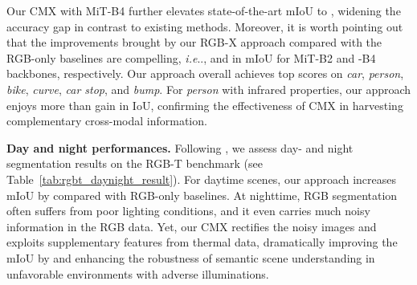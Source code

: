 \documentclass[journal]{IEEEtran}
\makeatletter
\DeclareRobustCommand\onedot{\futurelet\@let@token\@onedot}
\def\@onedot{\ifx\@let@token.\else.\null\fi\xspace}
\def\ie{\emph{i.e}\onedot} \def\Ie{\emph{I.e}\onedot}
\makeatother
\begin{document}
Our CMX with MiT-B4 further elevates state-of-the-art mIoU to , widening the accuracy gap in contrast to existing methods.
Moreover, it is worth pointing out that the improvements brought by our RGB-X approach compared with the RGB-only baselines are compelling, \ie,  and  in mIoU for MiT-B2 and -B4 backbones, respectively.
Our approach overall achieves top scores on \emph{car}, \emph{person}, \emph{bike}, \emph{curve}, \emph{car stop}, and \emph{bump}. 
For \emph{person} with infrared properties, our approach enjoys more than  gain in IoU, confirming the effectiveness of CMX in harvesting complementary cross-modal information.

\begin{table}[t]
    \begin{center}
        \caption{\textsc{Segmentation results on daytime- and nighttime images on MFNet dataset~\cite{ha2017mfnet}.}}
        \label{tab:rgbt_daynight_result}
        
     \end{center}
\end{table}
\noindent\textbf{Day and night performances.}
Following \cite{sun2020fuseseg,zhou2021gmnet}, we assess day- and night segmentation results on the RGB-T benchmark (see Table~\ref{tab:rgbt_daynight_result}).
For daytime scenes, our approach increases mIoU by  compared with RGB-only baselines. At nighttime, RGB segmentation often suffers from poor lighting conditions, and it even carries much noisy information in the RGB data. Yet, our CMX rectifies the noisy images and exploits supplementary features from thermal data, dramatically improving the mIoU by  and enhancing the robustness of semantic scene understanding in unfavorable environments with adverse illuminations.
\end{document}
